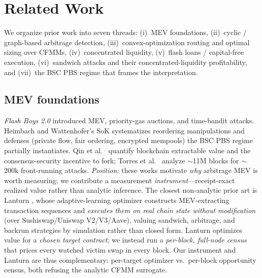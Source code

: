 \documentclass[11pt]{article}
\begin{document}
\section{Related Work}

We organize prior work into seven threads: (i)~MEV foundations, (ii)~cyclic /
graph-based arbitrage detection, (iii)~convex-optimization routing and optimal
sizing over CFMMs, (iv)~concentrated liquidity, (v)~flash loans / capital-free
execution, (vi)~sandwich attacks and their concentrated-liquidity profitability, and
(vii)~the BSC PBS regime that frames the interpretation.

\subsection{MEV foundations}
\emph{Flash Boys 2.0} \cite{daian2020flashboys} introduced MEV, priority-gas
auctions, and time-bandit attacks. Heimbach and Wattenhofer's SoK
\cite{heimbach2022sok} systematizes reordering manipulations and defenses (private
flow, fair ordering, encrypted mempools) the BSC PBS regime partially instantiates.
Qin et al.\ \cite{qin2022quantifying} quantify blockchain extractable value and the
consensus-security incentive to fork; Torres et al.\ \cite{torres2021frontrunner}
analyze $\sim$11M blocks for $\sim$200k front-running attacks. \emph{Position:} these
works motivate \emph{why} arbitrage MEV is worth measuring; we contribute a
measurement \emph{instrument}---receipt-exact realized value rather than analytic
inference. The closest non-analytic prior art is Lanturn \cite{babel2023lanturn},
whose adaptive-learning optimizer constructs MEV-extracting transaction sequences and
\emph{executes them on real chain state without modification} (over
Sushiswap/Uniswap V2/V3/Aave), valuing sandwich, arbitrage, and backrun strategies by
simulation rather than closed form. Lanturn optimizes value for a \emph{chosen target
contract}; we instead run a \emph{per-block, full-node census} that prices every
watched victim swap in every block. Our instrument and Lanturn are thus
complementary: per-target optimizer vs.\ per-block opportunity census, both refusing
the analytic CFMM surrogate.
\end{document}
